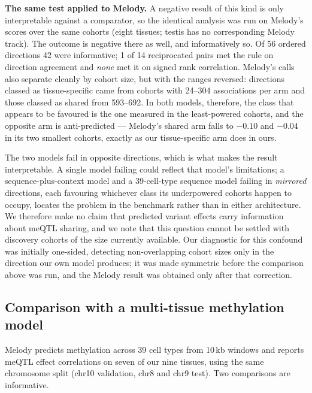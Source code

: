 \documentclass[10pt,letterpaper,twocolumn]{article}
\begin{document}
\textbf{The same test applied to Melody.} A negative result of this kind is
only interpretable against a comparator, so the identical analysis was run on
Melody's scores over the same cohorts (eight tissues; testis has no
corresponding Melody track). The outcome is negative there as well, and
informatively so. Of 56 ordered directions 42 were informative; 1 of 14
reciprocated pairs met the rule on direction agreement and \emph{none} met it on
signed rank correlation. Melody's calls also separate cleanly by cohort size,
but with the ranges reversed: directions classed as tissue-specific came from
cohorts with 24--304 associations per arm and those classed as shared from
593--692. In both models, therefore, the class that appears to be favoured is the
one measured in the least-powered cohorts, and the opposite arm is
anti-predicted --- Melody's shared arm falls to $-0.10$ and $-0.04$ in its two
smallest cohorts, exactly as our tissue-specific arm does in ours.

The two models fail in opposite directions, which is what makes the result
interpretable. A single model failing could reflect that model's limitations; a
sequence-plus-context model and a 39-cell-type sequence model failing in
\emph{mirrored} directions, each favouring whichever class its underpowered
cohorts happen to occupy, locates the problem in the benchmark rather than in
either architecture. We therefore make no claim that predicted variant effects
carry information about meQTL sharing, and we note that this question cannot be
settled with discovery cohorts of the size currently available. Our diagnostic
for this confound was initially one-sided, detecting non-overlapping cohort
sizes only in the direction our own model produces; it was made symmetric before
the comparison above was run, and the Melody result was obtained only after that
correction.

\subsection{Comparison with a multi-tissue methylation model}
\label{sec:melody}

Melody \cite{jin2026melody} predicts methylation across 39 cell types from
10\,kb windows and reports meQTL effect correlations on seven of our nine
tissues, using the same chromosome split (chr10 validation, chr8 and chr9 test).
Two comparisons are informative.
\end{document}
